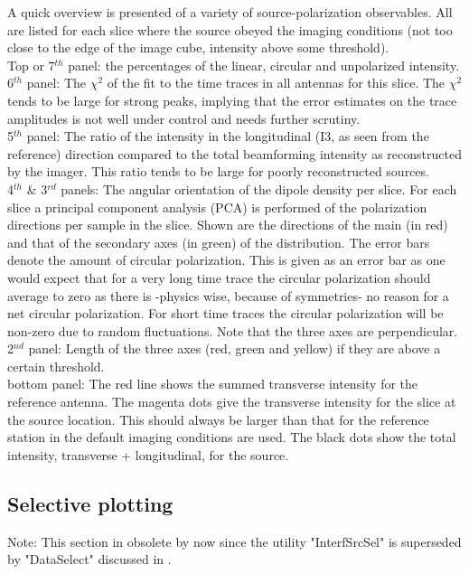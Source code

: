 A quick overview is presented of a variety of source-polarization observables. All are listed for each slice where the source obeyed the imaging conditions (not too close to the edge of the image cube, intensity above some threshold).
\\Top or 7$^{th}$ panel: the percentages of the linear, circular and unpolarized intensity.
\\6$^{th}$ panel: The $\chi^2$ of the fit to the time traces in all antennas for this slice. The $\chi^2$ tends to be large for strong peaks, implying that the error estimates on the trace amplitudes is not well under control and needs further scrutiny.
\\5$^{th}$ panel: The ratio of the intensity in the longitudinal (I3, as seen from the reference) direction compared to the total beamforming intensity as reconstructed by the imager. This ratio tends to be large for poorly reconstructed sources.
\\4$^{th}$ \& 3$^{rd}$ panels: The angular orientation of the dipole density per slice. For each slice a principal component analysis (PCA) is performed of the polarization directions per sample in the slice. Shown are the directions of the main (in red) and that of the secondary axes (in green) of the distribution. The error bars denote the amount of circular polarization. This is given as an error bar as one would expect that for a very long time trace the circular polarization should average to zero as there is -physics wise, because of symmetries- no reason for a net circular polarization. For short time traces the circular polarization will be non-zero due to random fluctuations. Note that the three axes are perpendicular.
\\2$^{nd}$ panel: Length of the three axes (red, green and yellow) if they are above a certain threshold.
\\bottom panel: The red line shows the summed transverse intensity for the reference antenna. The magenta dots give the transverse intensity for the slice at the source location. This should always be larger than that for the reference station in the default imaging conditions are used. The black dots show the total intensity, transverse + longitudinal, for the source.

\subsection{Selective plotting}

Note: This section in obsolete by now since the utility "InterfSrcSel" is superseded by "DataSelect" discussed in .

